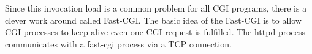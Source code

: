 Since this invocation load is a common problem for all CGI programs,
there is a clever work around called Fast-CGI.
The basic idea of the Fast-CGI is to allow
CGI processes to keep alive even one CGI request is fulfilled.
The httpd process communicates with a fast-cgi process via a TCP connection.
 
\begin{refdesc}
 {}



\end{refdesc}

